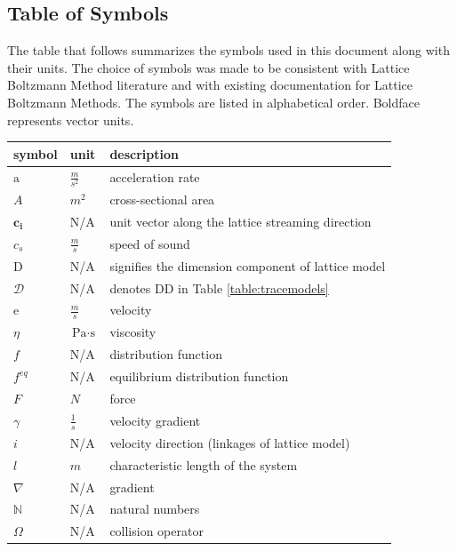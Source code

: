 \documentclass[12pt]{article}
\begin{document}
\subsection{Table of Symbols}
\label{CASYMBOLS}

The table that follows summarizes the symbols used in this document along with
their units.  The choice of symbols was made to be consistent with Lattice Boltzmann Method literature and with existing documentation for Lattice Boltzmann Methods. The symbols are listed in alphabetical order. Boldface represents vector units.

\renewcommand{\arraystretch}{1.2}
\noindent \begin{longtable*}{l l p{12cm}} \toprule
\textbf{symbol} & \textbf{unit} & \textbf{description}\\
\midrule 
$\mathrm{a}$ & $\frac{m}{s^2}$ & acceleration rate
\\
$A$ & $m^2$ & cross-sectional area
\\
$\textbf{c}_\textbf{i}$ & N/A & unit vector along the lattice streaming direction
\\
$c_s$ & $\frac{m}{s}$ & speed of sound
\\
$\mathrm{D}$ & N/A & signifies the dimension component of lattice model
\\
$\mathscr{D}$ & N/A & denotes DD in Table \ref{table:tracemodels}
\\
$\mathrm{e}$ & $\frac{m}{s}$ & velocity
\\
$\eta$ & $\si{\pascal}\cdot\si{\second}$ & viscosity %
\\ 
$f$ & N/A & distribution function
\\
$f^{eq}$ & N/A & equilibrium distribution function
\\
$F$ & $N$ & force
\\
$\gamma$ & $\frac{1}{s}$ & velocity gradient
\\
$i$ & N/A & velocity direction (linkages of lattice model)
\\
$l$ & $m$ & characteristic length of the system
\\
$\nabla$ & N/A & gradient
\\
$\mathbb{N}$ & N/A & natural numbers
\\
$\Omega$ & N/A & collision operator

\end{longtable*}
\end{document}
